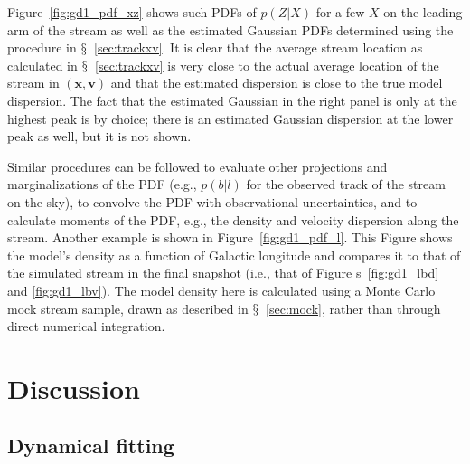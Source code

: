 \documentclass[12pt,preprint]{aastex}
\newcommand{\ie}{i.e.}
\newcommand{\eg}{e.g.}
\renewcommand{\figurename}{Figure}
\newcommand{\sectionname}{$\mathsection$}
\renewcommand{\vec}[1]{\ensuremath{\mathbf{#1}}}
\newcommand{\vecx}{\ensuremath{\vec{x}}}
\newcommand{\vecv}{\ensuremath{\vec{v}}}
\begin{document}
\figurename~\ref{fig:gd1_pdf_xz} shows such PDFs of $p(Z|X)$ for a few
$X$ on the leading arm of the stream as well as the estimated Gaussian
PDFs determined using the procedure in
\sectionname~\ref{sec:trackxv}. It is clear that the average stream
location as calculated in \sectionname~\ref{sec:trackxv} is very close
to the actual average location of the stream in $(\vecx,\vecv)$ and
that the estimated dispersion is close to the true model
dispersion. The fact that the estimated Gaussian in the right panel is
only at the highest peak is by choice; there is an estimated Gaussian
dispersion at the lower peak as well, but it is not shown.

Similar procedures can be followed to evaluate other projections and
marginalizations of the PDF (\eg, $p(b|l)$ for the observed track of
the stream on the sky), to convolve the PDF with observational
uncertainties, and to calculate moments of the PDF, \eg, the density
and velocity dispersion along the stream. Another example is shown in
\figurename~\ref{fig:gd1_pdf_l}. This Figure shows the model's density
as a function of Galactic longitude and compares it to that of the
simulated stream in the final snapshot (\ie, that of \figurename
s~\ref{fig:gd1_lbd} and \ref{fig:gd1_lbv}). The model density here is
calculated using a Monte Carlo mock stream sample, drawn as described
in \sectionname~\ref{sec:mock}, rather than through direct numerical
integration.


\section{Discussion}\label{sec:discussion}

\subsection{Dynamical fitting}
\end{document}
